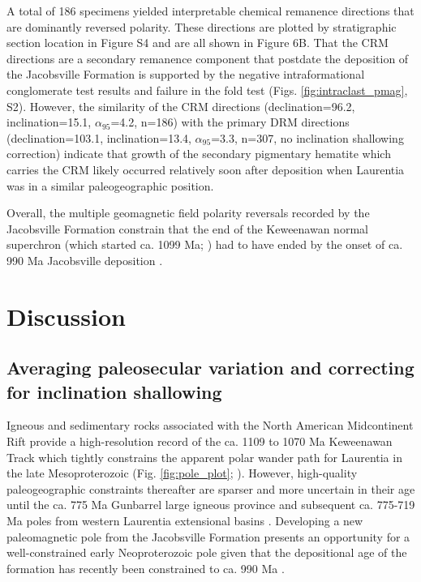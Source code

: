\documentclass[draft]{agujournal2019}
\begin{document}
A total of 186 specimens yielded interpretable chemical remanence directions that are dominantly reversed polarity. These directions are plotted by stratigraphic section location in Figure S4 and are all shown in Figure 6B. That the CRM directions are a secondary remanence component that postdate the deposition of the Jacobsville Formation is supported by the negative intraformational conglomerate test results and failure in the fold test (Figs. \ref{fig:intraclast_pmag}, S2). However, the similarity of the CRM directions (declination=96.2\textdegree, inclination=15.1\textdegree, $\alpha_{95}$=4.2\textdegree, n=186) with the primary DRM directions (declination=103.1\textdegree, inclination=13.4\textdegree, $\alpha_{95}$=3.3\textdegree, n=307, no inclination shallowing correction) indicate that growth of the secondary pigmentary hematite which carries the CRM likely occurred relatively soon after deposition when Laurentia was in a similar paleogeographic position. 

Overall, the multiple geomagnetic field polarity reversals recorded by the Jacobsville Formation constrain that the end of the Keweenawan normal superchron \cite{Driscoll2016b} (which started ca. 1099 Ma; \cite{Swanson-Hysell2019a}) had to have ended by the onset of ca. 990 Ma Jacobsville deposition \cite{Hodgin2022a}.
 
\section*{Discussion}
\subsection*{Averaging paleosecular variation and correcting for inclination shallowing}

Igneous and sedimentary rocks associated with the North American Midcontinent Rift provide a high-resolution record of the ca. 1109 to 1070 Ma Keweenawan Track which tightly constrains the apparent polar wander path for Laurentia in the late Mesoproterozoic (Fig. \ref{fig:pole_plot}; ). However, high-quality paleogeographic constraints thereafter are sparser and more uncertain in their age until the ca. 775 Ma Gunbarrel large igneous province \cite{Harlan2003a} and subsequent ca. 775-719 Ma poles from western Laurentia extensional basins \cite{Weil2006a, Eyster2019a}. Developing a new paleomagnetic pole from the Jacobsville Formation presents an opportunity for a well-constrained early Neoproterozoic pole given that the depositional age of the formation has recently been constrained to ca. 990 Ma \cite{Hodgin2022a}. 
\end{document}
